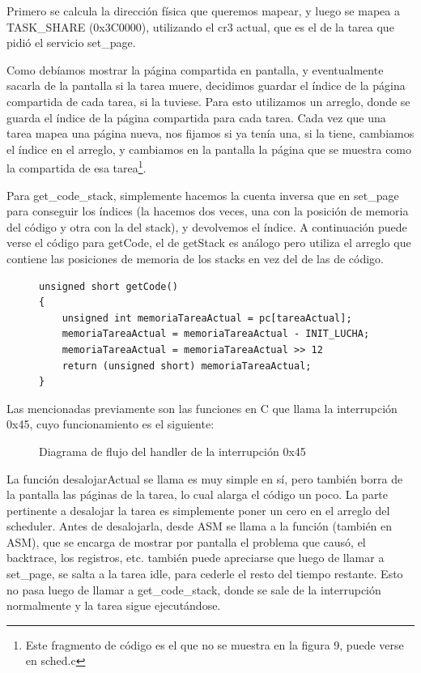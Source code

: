 \documentclass[10pt, a4paper]{article}
\begin{document}
Primero se calcula la dirección física que queremos mapear, y luego se mapea a TASK\_SHARE (0x3C0000), utilizando el cr3 actual, que es el de la tarea que pidió el servicio set\_page.

Como debíamos mostrar la página compartida en pantalla, y eventualmente sacarla de la pantalla si la tarea muere, decidimos guardar el índice de la página compartida de cada tarea, si la tuviese. Para esto utilizamos un arreglo, donde se guarda el índice de la página compartida para cada tarea. Cada vez que una tarea mapea una página nueva, nos fijamos si ya tenía una, si la tiene, cambiamos el índice en el arreglo, y cambiamos en la pantalla la página que se muestra como la compartida de esa tarea\footnote{Este fragmento de código es el que no se muestra en la figura 9, puede verse en sched.c}.

Para get\_code\_stack, simplemente hacemos la cuenta inversa que en set\_page para conseguir los índices (la hacemos dos veces, una con la posición de memoria del código y otra con la del stack), y devolvemos el índice.
A continuación puede verse el código para getCode, el de getStack es análogo pero utiliza el arreglo que contiene las posiciones de memoria de los stacks en vez del de las de código.
\begin{figure}[!h]
\begin{center}
\begin{verbatim}
unsigned short getCode()
{
	unsigned int memoriaTareaActual = pc[tareaActual];
	memoriaTareaActual = memoriaTareaActual - INIT_LUCHA;
	memoriaTareaActual = memoriaTareaActual >> 12
	return (unsigned short) memoriaTareaActual;
}
\end{verbatim}
\end{center}
\end{figure}

Las mencionadas previamente son las funciones en C que llama la interrupción 0x45, cuyo funcionamiento es el siguiente:

	\begin{figure}[H]
  		\centering
		\caption{Diagrama de flujo del handler de la interrupción 0x45}
		\label{fig:i45}
	\end{figure}
	
La función desalojarActual se llama es muy simple en sí, pero también borra de la pantalla las páginas de la tarea, lo cual alarga el código un poco. La parte pertinente a desalojar la tarea es simplemente poner un cero en el arreglo del scheduler. Antes de desalojarla, desde ASM se llama a la función (también en ASM), que se encarga de mostrar por pantalla el problema que causó, el backtrace, los registros, etc.
también puede apreciarse que luego de llamar a set\_page, se salta a la tarea idle, para cederle el resto del tiempo restante. Esto no pasa luego de llamar a get\_code\_stack, donde se sale de la interrupción normalmente y la tarea sigue ejecutándose.
\end{document}
